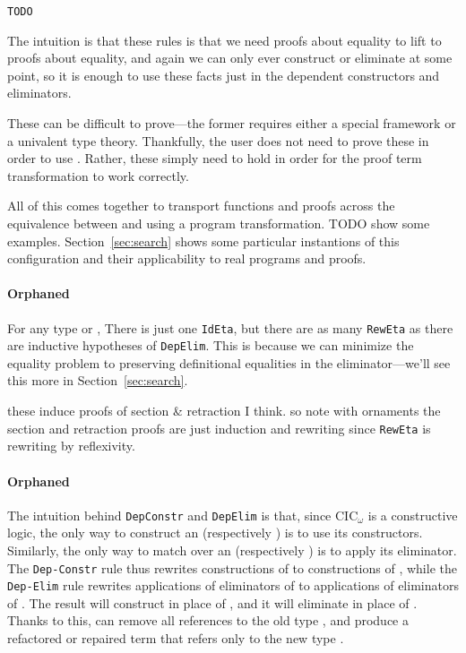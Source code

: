 \begin{lstlisting}
TODO
\end{lstlisting}
The intuition is that these rules is that we need proofs about equality to lift to proofs about equality,
and again we can only ever construct or eliminate at some point, so it is enough
to use these facts just in the dependent constructors and eliminators.

These can be difficult to prove---the former requires either a special framework %
or a univalent type theory.
Thankfully, the user does not need to prove these in order to use \toolname.
Rather, these simply need to hold in order for the proof term transformation to work correctly.

All of this comes together to transport functions and proofs across the equivalence between \A and \B
using a program transformation.
TODO show some examples.
Section~\ref{sec:search} shows some particular instantions of this configuration and their applicability to real programs and proofs.

\paragraph{Orphaned}

For any type \A or \B,
There is just one \lstinline{IdEta}, but there are as many \lstinline{RewEta} as there are
inductive hypotheses of \lstinline{DepElim}.
This is because we can minimize the equality problem to preserving definitional equalities
in the eliminator---we'll see this more in Section~\ref{sec:search}.

these induce proofs of section \& retraction I think.
so note with ornaments the section and retraction proofs are just induction and rewriting since \lstinline{RewEta} is
rewriting by reflexivity.

\paragraph{Orphaned}
The intuition behind \lstinline{DepConstr} and \lstinline{DepElim} is that,
since CIC$_{\omega}$ is a constructive logic, the only way to construct an \A (respectively \B) is to use its constructors.
Similarly, the only way to match over an \A (respectively \B) is to apply its eliminator. 
The \lstinline{Dep-Constr} rule thus rewrites constructions of \A to constructions of \B,
while the \lstinline{Dep-Elim} rule rewrites applications of eliminators of \A to applications of eliminators of \B.
The result will construct \B in place of \A, and it will eliminate \B in place of \A.
Thanks to this, \toolname can remove all references to the old type \A,
and produce a refactored or repaired term that refers only to the new type \B.

